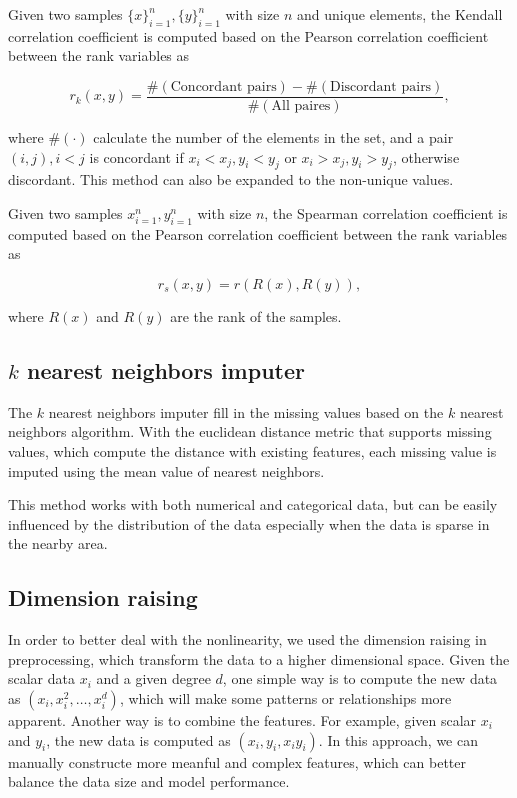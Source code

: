 \documentclass[11pt]{article}
\begin{document}
Given two samples $\{x\}_{i=1}^n, \{y\}_{i=1}^n$ with size $n$ and unique elements, the Kendall correlation coefficient is computed based on the Pearson correlation coefficient between the rank variables as

$$
  r_k (x, y) = \frac{\#(\text{Concordant pairs}) - \#(\text{Discordant pairs})}{\#(\text{All paires})},
$$

\noindent where $\#(\cdot)$ calculate the number of the elements in the set, and a pair $(i, j), i < j$ is concordant if $x_i < x_j, y_i < y_j$ or $x_i > x_j, y_i > y_j$, otherwise discordant. This method can also be expanded to the non-unique values.

Given two samples ${x}_{i=1}^n, {y}_{i=1}^n$ with size $n$, the Spearman correlation coefficient is computed based on the Pearson correlation coefficient between the rank variables as

$$
  r_s (x, y) = r(R(x), R(y)),
$$

\noindent where $R(x)$ and $R(y)$ are the rank of the samples.

\subsection{$k$ nearest neighbors imputer}

The $k$ nearest neighbors imputer fill in the missing values based on the $k$ nearest neighbors algorithm. With the euclidean distance metric that supports missing values, which compute the distance with existing features, each missing value is imputed using the mean value of nearest neighbors.

This method works with both numerical and categorical data, but can be easily influenced by the distribution of the data especially when the data is sparse in the nearby area.

\subsection{Dimension raising}

In order to better deal with the nonlinearity, we used the dimension raising in preprocessing, which transform the data to a higher dimensional space. Given the scalar data $x_i$ and a given degree $d$, one simple way is to compute the new data as $(x_i, x_i^2, \dots, x_i^d)$, which will make some patterns or relationships more apparent. Another way is to combine the features. For example, given scalar $x_i$ and $y_i$, the new data is computed as $(x_i, y_i, x_i y_i)$. In this approach, we can manually constructe more meanful and complex features, which can better balance the data size and model performance.
\end{document}
